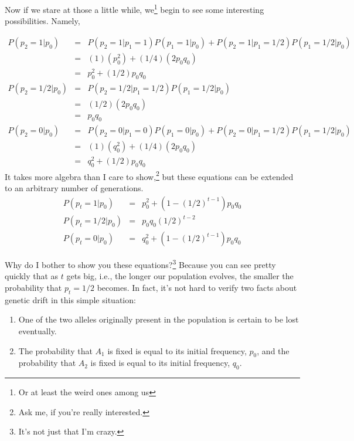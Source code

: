 Now if we stare at those a little while, we\footnote{Or at least the
weird ones among us} begin to see some interesting
possibilities. Namely,

\begin{eqnarray*}
P(p_2=1|p_0) &=& P(p_2=1|p_1=1)P(p_1=1|p_0) + P(p_2=1|p_1=1/2)P(p_1=1/2|p_0) \\
             &=& (1)(p_0^2) + (1/4)(2p_0q_0) \\
             &=& p_0^2 + (1/2)p_0q_0 \\
P(p_2=1/2|p_0) &=& P(p_2=1/2|p_1=1/2)P(p_1=1/2|p_0) \\
               &=& (1/2)(2p_0q_0) \\
               &=& p_0q_0 \\
P(p_2=0|p_0) &=& P(p_2=0|p_1=0)P(p_1=0|p_0) + P(p_2=0|p_1=1/2)P(p_1=1/2|p_0) \\
             &=& (1)(q_0^2) + (1/4)(2p_0q_0) \\
             &=& q_0^2 + (1/2)p_0q_0
\end{eqnarray*}
It takes more algebra than I care to show,\footnote{Ask me, if you're
  really interested.} but these equations can be extended to an
arbitrary number of generations.
\begin{eqnarray*}
P(p_t=1|p_0) &=& p_0^2 + \left(1 - (1/2)^{t-1}\right)p_0q_0 \\
P(p_t=1/2|p_0) &=& p_0q_0(1/2)^{t-2} \\
P(p_t=0|p_0) &=& q_0^2 + \left(1 - (1/2)^{t-1}\right)p_0q_0
\end{eqnarray*}

Why do I bother to show you these equations?\footnote{It's not just
that I'm crazy.} Because you can see pretty quickly that as $t$ gets
big, i.e., the longer our population evolves, the smaller the
probability that $p_t = 1/2$ becomes. In fact, it's not hard to verify
two facts about genetic drift in this simple situation:

\begin{enumerate}

\item One of the two alleles originally present in the population is
certain to be lost eventually.

\item The probability that $A_1$ is fixed is equal to its initial
frequency, $p_0$, and the probability that $A_2$ is fixed is equal to
its initial frequency, $q_0$.

\end{enumerate}

